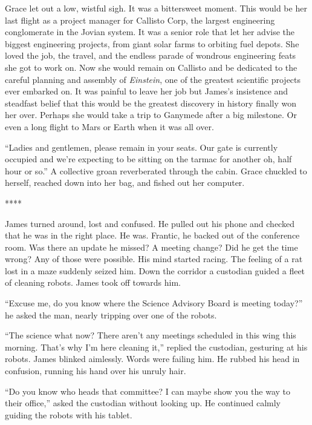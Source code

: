 \documentclass[12pt]{article} %
\begin{document}
Grace let out a low, wistful sigh. It was a bittersweet moment. This would be her last flight as a project manager for Callisto Corp, the largest engineering conglomerate in the Jovian system. It was a senior role that let her advise the biggest engineering projects, from giant solar farms to orbiting fuel depots. She loved the job, the travel, and the endless parade of wondrous engineering feats she got to work on. Now she would remain on Callisto and be dedicated to the careful planning and assembly of \textit{Einstein}, one of the greatest scientific projects ever embarked on. It was painful to leave her job but James's insistence and steadfast belief that this would be the greatest discovery in history finally won her over. Perhaps she would take a trip to Ganymede after a big milestone. Or even a long flight to Mars or Earth when it was all over.

``Ladies and gentlemen, please remain in your seats. Our gate is currently occupied and we're expecting to be sitting on the tarmac for another oh, half hour or so.'' A collective groan reverberated through the cabin. Grace chuckled to herself, reached down into her bag, and fished out her computer.

\begin{center}
****
\end{center}

James turned around, lost and confused. He pulled out his phone and checked that he was in the right place. He was. Frantic, he backed out of the conference room. Was there an update he missed? A meeting change? Did he get the time wrong? Any of those were possible. His mind started racing. The feeling of a rat lost in a maze suddenly seized him. Down the corridor a custodian guided a fleet of cleaning robots. James took off towards him.

``Excuse me, do you know where the Science Advisory Board is meeting today?'' he asked the man, nearly tripping over one of the robots.

``The science what now? There aren't any meetings scheduled in this wing this morning. That's why I'm here cleaning it,'' replied the custodian, gesturing at his robots. James blinked aimlessly. Words were failing him. He rubbed his head in confusion, running his hand over his unruly hair.

``Do you know who heads that committee? I can maybe show you the way to their office,'' asked the custodian without looking up. He continued calmly guiding the robots with his tablet.
\end{document}

